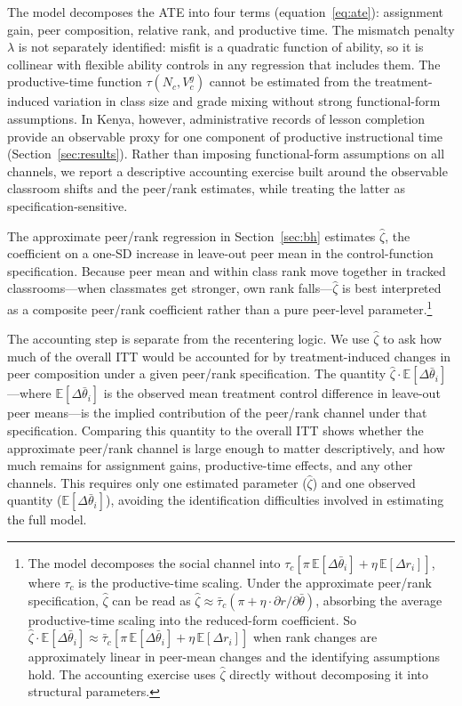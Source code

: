 \documentclass[11pt]{article}
\newcommand{\E}{\mathbb{E}}
\begin{document}
The model decomposes the ATE into four terms (equation~\ref{eq:ate}): assignment gain, peer composition, relative rank, and productive time. The mismatch penalty $\lambda$ is not separately identified: misfit is a quadratic function of ability, so it is collinear with flexible ability controls in any regression that includes them. The productive-time function $\tau(N_c, V^g_c)$ cannot be estimated from the \mbox{treatment-induced} variation in class size and grade mixing without strong functional-form assumptions. In Kenya, however, administrative records of lesson completion provide an observable proxy for one component of productive instructional time (Section~\ref{sec:results}). Rather than imposing functional-form assumptions on all channels, we report a descriptive accounting exercise built around the observable classroom shifts and the peer/rank estimates, while treating the latter as specification-sensitive.

The approximate peer/rank regression in Section~\ref{sec:bh} estimates $\hat{\zeta}$, the coefficient on a one-SD increase in leave-out peer mean in the control-function specification. Because peer mean and within class rank move together in tracked classrooms---when classmates get stronger, own rank falls---$\hat{\zeta}$ is best interpreted as a composite peer/rank coefficient rather than a pure peer-level parameter.\footnote{The model decomposes the social channel into $\tau_c[\pi\,\E[\Delta\bar{\theta}_i] + \eta\,\E[\Delta r_i]]$, where $\tau_c$ is the productive-time scaling. Under the approximate peer/rank specification, $\hat{\zeta}$ can be read as $\hat{\zeta} \approx \bar{\tau}_c(\pi + \eta \cdot \partial r / \partial \bar{\theta})$, absorbing the average productive-time scaling into the reduced-form coefficient. So $\hat{\zeta} \cdot \E[\Delta\bar{\theta}_i] \approx \bar{\tau}_c[\pi\,\E[\Delta\bar{\theta}_i] + \eta\,\E[\Delta r_i]]$ when rank changes are approximately linear in peer-mean changes and the identifying assumptions hold. The accounting exercise uses $\hat{\zeta}$ directly without decomposing it into structural parameters.}

The accounting step is separate from the recentering logic. We use $\hat{\zeta}$ to ask how much of the overall ITT would be accounted for by treatment-induced changes in peer composition under a given peer/rank specification. The quantity $\hat{\zeta} \cdot \E[\Delta\bar{\theta}_i]$---where $\E[\Delta\bar{\theta}_i]$ is the observed mean treatment control difference in leave-out peer means---is the implied contribution of the peer/rank channel under that specification. Comparing this quantity to the overall ITT shows whether the approximate peer/rank channel is large enough to matter descriptively, and how much remains for assignment gains, productive-time effects, and any other channels. This requires only one estimated parameter ($\hat{\zeta}$) and one observed quantity ($\E[\Delta\bar{\theta}_i]$), avoiding the identification difficulties involved in estimating the full model.
\end{document}

